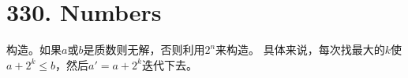 \section{330. Numbers}
构造。如果$a$或$b$是质数则无解，否则利用$2^n$来构造。
具体来说，每次找最大的$k$使$a+2^k \le b$，然后$a'=a+2^k$迭代下去。
